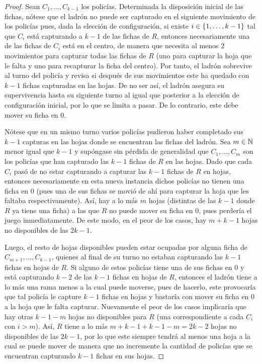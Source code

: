 \begin{proof}
    Sean $C_1,\dots, C_{k-1}$ los polic\'ias. Determinada la disposici\'on inicial
    de las fichas, n\'otese que el ladr\'on no puede ser capturado en el siguiente
    movimiento de los polic\'ias pues, dada la elecci\'on de configuraci\'on, si
    existe $i\in\{1,\dots, k-1\}$ tal que $C_i$ est\'a capturando a $k-1$ de las
    fichas de $R$, entonces necesariamente una de las fichas de $C_i$ est\'a en el
    centro, de manera que necesita al menos $2$ movimientos para capturar todas
    las fichas de $R$ (uno para capturar la hoja que le falta y uno para
    recapturar la ficha del centro). Por tanto, el ladr\'on sobrevive al turno del
    polic\'ia y revisa si despu\'es de sus movimientos este ha quedado con $k-1$
    fichas capturadas en las hojas. De no ser as\'i, el ladr\'on asegura su
    supervivencia hasta su siguiente turno al igual que posterior a la elecci\'on
    de configuraci\'on inicial, por lo que se limita a pasar. De lo contrario,
    este debe mover su ficha en $0$.
    
    N\'otese que en un mismo turno varios polic\'ias pudieron haber completado sus
    $k-1$ capturas en las hojas donde se encuentran las fichas del ladr\'on. Sea
    $m\in \mathbb{N}$ menor igual que $k-1$ y sup\'ongase sin p\'erdida de generalidad que
    $C_{1},\dots, C_{m}$ son los polic\'ias que han capturado las $k-1$ fichas de
    $R$ en las hojas. Dado que cada $C_{i}$ pas\'o de no estar capturando a
    capturar las $k-1$ fichas de $R$ en hojas, entonces necesariamente en esta
    nueva instancia dichos polic\'ias no tienen una ficha en $0$ (pues una de sus
    fichas se movi\'o de ah\'i para capturar la hoja que les faltaba
    respectivamente). As\'i, hay a lo m\'as $m$ hojas (distintas de las $k-1$ donde
    $R$ ya tiene una ficha) a las que $R$ no puede mover su ficha en $0$, pues
    perder\'ia el juego inmediatamente. De este modo, en el peor de los casos, hay
    $m+k-1$ hojas no disponibles de las $2k-1$.

   Luego, el resto de hojas disponibles pueden estar ocupadas por alguna ficha
   de  $C_{{m+1}},\dots,C_{{k-1}}$, quienes al final de su turno no estaban
   capturando las $k-1$ fichas en hojas de $R$. Si alguno de estos polic\'ias
   tiene una de sus fichas en $0$ y est\'a capturando $k-2$ de las $k-1$ fichas en
   hojas de $R$, entonces el ladr\'on tiene a lo m\'as una rama menos a la cual
   puede moverse, pues de hacerlo, este provocar\'ia que tal polic\'ia le capture
   $k-1$ fichas en hojas y bastar\'ia con mover su ficha en $0$ a la hoja que le
   falta capturar. Nuevamente el peor de los casos implicar\'ia que hay otras
   $k-1-m$ hojas no disponibles para $R$ (una correspondiente a cada $C_i$ con
   $i>m$). As\'i, $R$ tiene a lo m\'as $m+k-1+k-1-m=2k-2$ hojas no disponibles de
   las $2k-1$, por lo que este siempre tendr\'a al menos una hoja a la cual se
   puede mover de manera que no incremente la cantidad de polic\'ias que se
   encuentran capturando $k-1$ fichas en sus hojas.


\end{proof}
